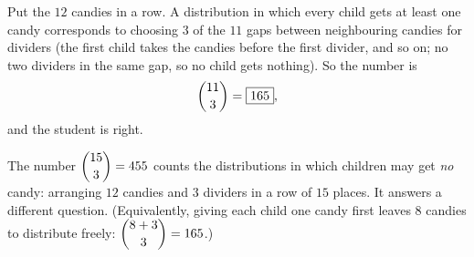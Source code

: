 Put the $12$ candies in a row. A distribution in which every child gets at least one candy corresponds to choosing $3$ of the $11$ gaps between neighbouring candies for dividers (the first child takes the candies before the first divider, and so on; no two dividers in the same gap, so no child gets nothing). So the number is
\[
\dbinom{11}{3}=\boxed{165},
\]
and the student is right.

The number $\dbinom{15}{3}=455$ counts the distributions in which children may get \emph{no} candy: arranging $12$ candies and $3$ dividers in a row of $15$ places. It answers a different question. (Equivalently, giving each child one candy first leaves $8$ candies to distribute freely: $\dbinom{8+3}{3}=165$.)
